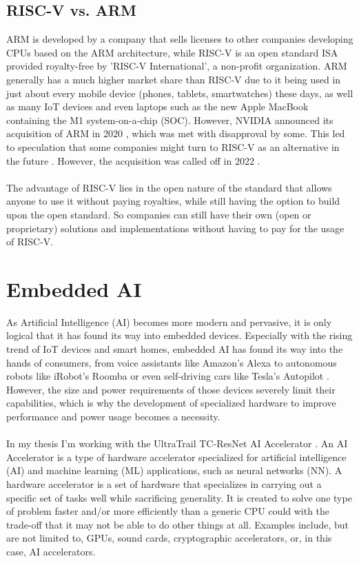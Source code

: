 \subsection{RISC-V vs. ARM}

ARM \cite{arm} is developed by a company that sells licenses to other companies developing CPUs based on the ARM architecture,
while RISC-V \cite{riscv} is an open standard ISA provided royalty-free by 'RISC-V International', a non-profit organization.
ARM generally has a much higher market share than RISC-V due to it being used in just about every mobile device (phones, tablets, smartwatches)
these days, as well as many IoT devices and even laptops such as the new Apple MacBook containing the M1 system-on-a-chip (SOC).
However, NVIDIA announced its acquisition of ARM in 2020 \cite{arm_sale}, which was met with disapproval by some.
This led to speculation that some companies might turn to RISC-V as an alternative in the future \cite{arm_sale_speculation}.
However, the acquisition was called off in 2022 \cite{arm_sale_called_off}.\\\\
The advantage of RISC-V lies in the open nature of the standard that allows anyone to use it without paying royalties, while still
having the option to build upon the open standard.
So companies can still have their own (open or proprietary) solutions and implementations \cite{riscv_about} without having to pay for
the usage of RISC-V.

\section{Embedded AI}

As Artificial Intelligence (AI) becomes more modern and pervasive, it is only logical that it has found its way into embedded devices.
Especially with the rising trend of IoT devices and smart homes, embedded AI has found its way into the hands of consumers,
from voice assistants like Amazon's Alexa \cite{alexa} to autonomous robots like iRobot's Roomba \cite{roomba} or even self-driving cars like Tesla's Autopilot \cite{autopilot}.
However, the size and power requirements of those devices severely limit their capabilities, which is why the development of specialized hardware to improve performance
and power usage becomes a necessity.\\\\
In my thesis I'm working with the UltraTrail TC-ResNet AI Accelerator \cite{ultratrail}.
An AI Accelerator is a type of hardware accelerator specialized for artificial intelligence (AI) and machine learning (ML) applications, such as neural networks (NN).
A hardware accelerator is a set of hardware that specializes in carrying out a specific set of tasks well while sacrificing generality.
It is created to solve one type of problem faster and/or more efficiently than a generic CPU could with the trade-off that it may not be able to do other things at all.
Examples include, but are not limited to, GPUs, sound cards, cryptographic accelerators, or, in this case, AI accelerators.\\\\


